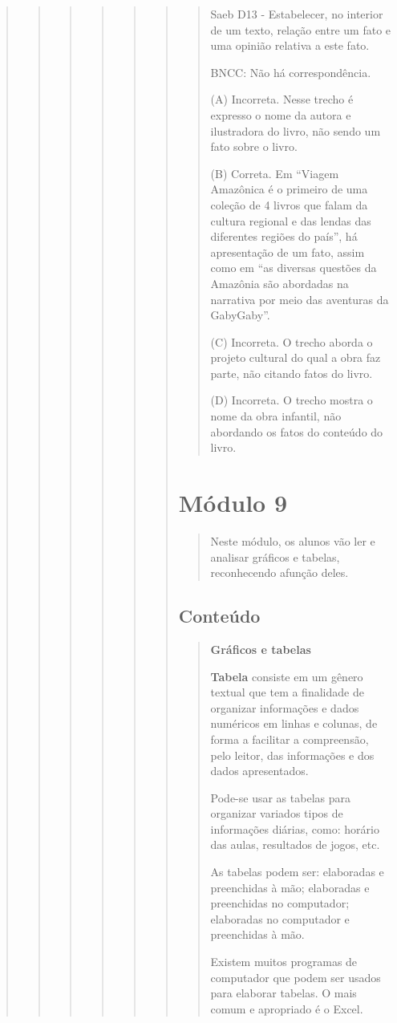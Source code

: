 \begin{quote}
\begin{quote}
\begin{quote}
\begin{quote}
\begin{quote}
\begin{quote}
\begin{quote}
Saeb D13 - Estabelecer, no interior de um texto, relação entre um fato e
uma opinião relativa a este fato.

BNCC: Não há correspondência.

(A) Incorreta. Nesse trecho é expresso o nome da autora e ilustradora do
livro, não sendo um fato sobre o livro.

(B) Correta. Em ``Viagem Amazônica é o primeiro de uma coleção de 4
livros que falam da cultura regional e das lendas das diferentes regiões
do país'', há apresentação de um fato, assim como em ``as diversas
questões da Amazônia são abordadas na narrativa por meio das aventuras
da GabyGaby''.

(C) Incorreta. O trecho aborda o projeto cultural do qual a obra faz
parte, não citando fatos do livro.

(D) Incorreta. O trecho mostra o nome da obra infantil, não abordando os
fatos do conteúdo do livro.
\end{quote}

\section{Módulo 9}\label{muxf3dulo-9}

\begin{quote}
Neste módulo, os alunos vão ler e analisar gráficos e tabelas,
reconhecendo afunção deles.
\end{quote}

\subsection{Conteúdo}\label{conteuxfado-8}

\begin{quote}
\textbf{Gráficos e tabelas}

\textbf{Tabela} consiste em um gênero textual que tem a finalidade de
organizar informações e dados numéricos em linhas e colunas, de forma a
facilitar a compreensão, pelo leitor, das informações e dos dados
apresentados.

Pode-se usar as tabelas para organizar variados tipos de informações
diárias, como: horário das aulas, resultados de jogos, etc.

As tabelas podem ser: elaboradas e preenchidas à mão; elaboradas e
preenchidas no computador; elaboradas no computador e preenchidas à mão.

Existem muitos programas de computador que podem ser usados para
elaborar tabelas. O mais comum e apropriado é o Excel.


\end{quote}
\end{quote}
\end{quote}
\end{quote}
\end{quote}
\end{quote}
\end{quote}
